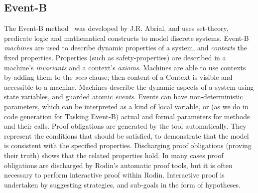 \documentclass{llncs}%
\begin{document}
\subsection{Event-B}
%
The Event-B method~\cite{ABR10} was developed by J.R. Abrial, and uses set-theory, predicate logic and mathematical constructs to model discrete systems. Event-B \emph{machines} are used to describe dynamic properties of a system, and \emph{contexts} the fixed properties. Properties (such as safety-properties) are described in a machine's \emph{invariants} and a context's \emph{axioms}.  Machines are able to use contexts by adding them to the \emph{sees} clause; then content of a Context is visible and accessible to a machine. Machines describe the dynamic aspects of a system using state variables, and guarded atomic \emph{events}. Events can have non-deterministic parameters, which can be interpreted as a kind of local variable, or (as we do in code generation for Tasking Event-B) actual and formal parameters for methods and their calls. Proof obligations are generated by the tool automatically. They represent the conditions that should be satisfied, to demonstrate that the model is consistent with the specified properties. Discharging proof obligations (proving their truth) shows that the related properties hold. In many cases proof obligations are discharged by Rodin's automatic proof tools, but it is often necessary to perform interactive proof within Rodin. Interactive proof is undertaken by suggesting strategies, and sub-goals in the form of hypotheses. 
\end{document}

